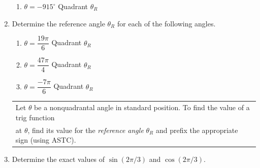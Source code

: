 \documentclass[11pt]{article}
\begin{document}
\begin{enumerate}
\begin{enumerate}
\item $\theta = -915^\circ$ \hspace{1in} Quadrant \underline{\phantom{sldkjfslkdjf}} \hspace{1in} $\theta_R$ \underline{\phantom{sldkjfslkdjf}}  \\[.8in]

\end{enumerate}

\item Determine the reference angle $\theta_R$ for each of the following angles. 
\begin{enumerate}

\item $\theta = \dfrac{19\pi}{6}$ \hspace{1in} Quadrant \underline{\phantom{sldkjfslkdjf}} \hspace{1in} $\theta_R$ \underline{\phantom{sldkjfslkdjf}} \vfill
\item $\theta = \dfrac{47\pi}{4}$ \hspace{1in} Quadrant \underline{\phantom{sldkjfslkdjf}} \hspace{1in} $ \theta_R$ \underline{\phantom{sldkjfslkdjf}} \vfill
\item $\theta = \dfrac{-7\pi}{6}$ \hspace{1in} Quadrant \underline{\phantom{sldkjfslkdjf}} \hspace{1in} $\theta_R$ \underline{\phantom{sldkjfslkdjf}} \vfill

\end{enumerate}

\newpage


\hspace{-.3in}\begin{tabular}{| l |} \hline
Let $\theta$ be a nonquadrantal angle in standard position. To find the value of a trig function\\ at $\theta$, find its value for the \emph{reference angle} $\theta_R$ and prefix the appropriate sign (using ASTC). \\ \hline
\end{tabular}

\item Determine the exact values of $\sin(2\pi/3)$ and $\cos(2\pi/3)$. \\[1.5in] %



\end{enumerate}
\end{document}
